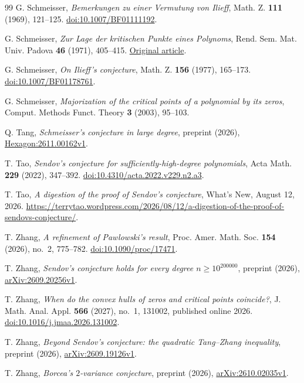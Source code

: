 \begin{thebibliography}{99}
G. Schmeisser, \emph{Bemerkungen zu einer Vermutung von Ilieff},
Math. Z. \textbf{111} (1969), 121--125.
\href{https://doi.org/10.1007/BF01111192}{doi:10.1007/BF01111192}.

G. Schmeisser, \emph{Zur Lage der kritischen Punkte eines Polynoms},
Rend. Sem. Mat. Univ. Padova \textbf{46} (1971), 405--415.
\href{https://www.numdam.org/item/RSMUP_1971__46__405_0/}{Original article}.

G. Schmeisser, \emph{On Ilieff's conjecture},
Math. Z. \textbf{156} (1977), 165--173.
\href{https://doi.org/10.1007/BF01178761}{doi:10.1007/BF01178761}.

G. Schmeisser, \emph{Majorization of the critical points of a polynomial
by its zeros}, Comput. Methods Funct. Theory \textbf{3} (2003), 95--103.

Q. Tang, \emph{Schmeisser's conjecture in large degree}, preprint
(2026), \href{https://hexagonmath.org/2611.00162v1}{Hexagon:2611.00162v1}.

T. Tao, \emph{Sendov's conjecture for sufficiently-high-degree
polynomials}, Acta Math. \textbf{229} (2022), 347--392.
\href{https://doi.org/10.4310/acta.2022.v229.n2.a3}{doi:10.4310/acta.2022.v229.n2.a3}.

T. Tao, \emph{A digestion of the proof of Sendov's conjecture},
What's New, August 12, 2026.
\url{https://terrytao.wordpress.com/2026/08/12/a-digestion-of-the-proof-of-sendovs-conjecture/}.

T. Zhang, \emph{A refinement of Pawlowski's result}, Proc. Amer. Math.
Soc. \textbf{154} (2026), no.~2, 775--782.
\href{https://doi.org/10.1090/proc/17471}{doi:10.1090/proc/17471}.

T. Zhang, \emph{Sendov's conjecture holds for every degree
$n\ge10^{200000}$}, preprint (2026),
\href{https://arxiv.org/abs/2609.20256v1}{arXiv:2609.20256v1}.

T. Zhang, \emph{When do the convex hulls of zeros and critical points
coincide?}, J. Math. Anal. Appl. \textbf{566} (2027), no.~1, 131002,
published online 2026.
\href{https://doi.org/10.1016/j.jmaa.2026.131002}{doi:10.1016/j.jmaa.2026.131002}.

T. Zhang, \emph{Beyond Sendov's conjecture: the quadratic Tang--Zhang
inequality}, preprint (2026),
\href{https://arxiv.org/abs/2609.19126v1}{arXiv:2609.19126v1}.

T. Zhang, \emph{Borcea's $2$-variance conjecture}, preprint (2026),
\href{https://arxiv.org/abs/2610.02035v1}{arXiv:2610.02035v1}.

\end{thebibliography}
